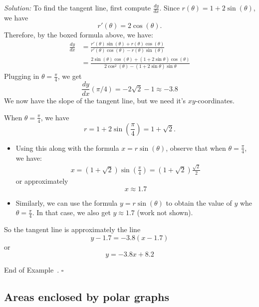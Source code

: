 \documentclass[10pt]{article}
\theoremstyle{definition}
\newtheorem{example}[theorem]{Example}
\renewenvironment{example}
{\begin{oldexample}}
  {\par\smallskip\hfill   End of Example~\theexample. $\square$    \par\end{oldexample}}
\newcommand{\1}[1]{\textbf{1}_{\left[#1\right]}} %
\begin{document}
\begin{example}
  \noindent\textit{Solution:} To find the tangent line, first compute $\frac{dy}{dx}$.  Since $r(\theta) = 1+2\sin(\theta)$, we
  have
  \begin{equation*}
    r'(\theta) = 2\cos(\theta).
  \end{equation*}
  Therefore, by the boxed formula above, we have:
  \begin{align*}
    \frac{dy}{dx} 
    &= \frac{r'(\theta)\sin(\theta) + r(\theta)\cos(\theta)}{r'(\theta)\cos(\theta)-r(\theta)\sin(\theta)}\\
    &= \frac{2\sin(\theta)\cos(\theta)+ (1+2\sin\theta)\cos(\theta)}{2\cos^{2}(\theta)- (1+2\sin \theta)\sin \theta}
  \end{align*}
  Plugging in $\theta=\frac{\pi}{4}$, we get
  \begin{equation}\label{eq:12}
    \frac{dy}{dx}(\pi/4) = -2 \sqrt{2} -1 \approx -3.8
  \end{equation}
  We now have the slope of the tangent line, but we need it's $xy$-coordinates.

  When $\theta=\frac{\pi}{4}$, we have
  \begin{equation*}
    r = 1+2\sin(\frac{\pi}{4}) = 1+\sqrt{2}.
  \end{equation*}
  \begin{itemize}
    \item Using this along with the formula $x=r\sin(\theta)$, observe that when $\theta=\frac{\pi}{4}$, we have:
    \begin{align*}
      x  = (1+\sqrt{2})\sin(\frac{\pi}{4}) = \left( 1+\sqrt{2} \right)\frac{\sqrt{2}}{2} 
    \end{align*}
    or approximately
    \begin{equation*}
      x \approx 1.7
    \end{equation*}
    \item Similarly, we can use the formula $y=r\sin(\theta)$ to obtain the value of $y$ whe $\theta=\frac{\pi}{4}$. In that
    case, we also get $y \approx 1.7$ (work not shown).
  \end{itemize}
  So the tangent line is approximately the line
  \begin{equation*}
    y -1.7 = -3.8(x-1.7)
  \end{equation*}
  or
  \begin{equation*}
    y = -3.8 x + 8.2
  \end{equation*}
\end{example}

\subsection{Areas enclosed by polar graphs}
\end{document}

